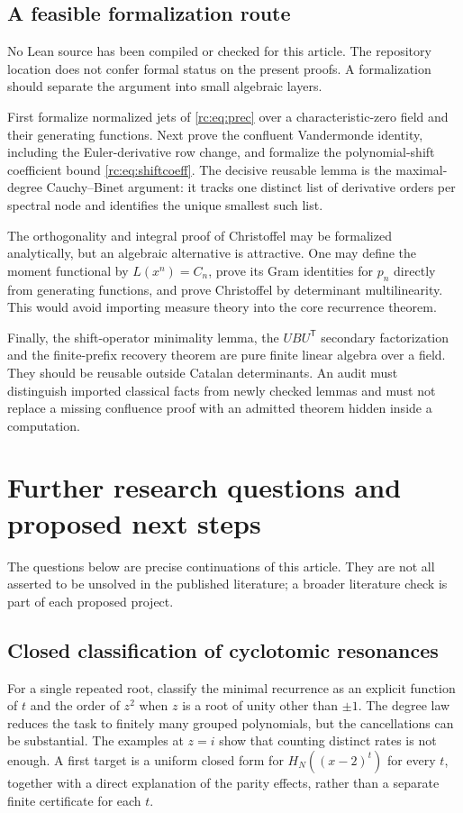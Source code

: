 \documentclass[11pt,a4paper]{article}
\numberwithin{equation}{section}
\theoremstyle{definition}
\theoremstyle{remark}
\begin{document}
\subsection{A feasible formalization route}
No Lean source has been compiled or checked for this article.  The
repository location does not confer formal status on the present proofs.
A formalization should separate the argument into small algebraic layers.

First formalize normalized jets of \eqref{rc:eq:prec} over a characteristic-zero
field and their generating functions.  Next prove the confluent
Vandermonde identity, including the Euler-derivative row change, and
formalize the polynomial-shift coefficient bound \eqref{rc:eq:shiftcoeff}.
The decisive reusable lemma is the maximal-degree Cauchy--Binet argument:
it tracks one distinct list of derivative orders per spectral node and
identifies the unique smallest such list.

The orthogonality and integral proof of Christoffel may be formalized
analytically, but an algebraic alternative is attractive.  One may define
the moment functional by $L(x^n)=C_n$, prove its Gram identities for
$p_n$ directly from generating functions, and prove Christoffel by
determinant multilinearity.  This would avoid importing measure theory
into the core recurrence theorem.

Finally, the shift-operator minimality lemma, the $UBU^{\mathsf T}$
secondary factorization and the finite-prefix recovery theorem are
pure finite linear algebra over a field.  They should be reusable
outside Catalan determinants.  An audit must distinguish imported
classical facts from newly checked lemmas and must not replace a missing
confluence proof with an admitted theorem hidden inside a computation.

\section{Further research questions and proposed next steps}\label{rc:sec:research}

The questions below are precise continuations of this article.  They
are not all asserted to be unsolved in the published literature; a
broader literature check is part of each proposed project.

\subsection{Closed classification of cyclotomic resonances}\label{cyc:x:rcq1}
For a single repeated root, classify the minimal recurrence as an
explicit function of $t$ and the order of $z^2$ when $z$ is a root of
unity other than $\pm1$.  The degree law reduces the task to finitely
many grouped polynomials, but the cancellations can be substantial.
The examples at $z=i$ show that counting distinct rates is not enough.
A first target is a uniform closed form for $H_N((x-2)^t)$ for every
$t$, together with a direct explanation of the parity effects, rather
than a separate finite certificate for each $t$.
\end{document}

